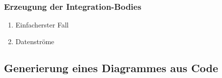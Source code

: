 \documentclass[11pt]{article}
\begin{document}
\subsubsection{Erzeugung der Integration-Bodies}
\label{sec:orgheadline45}
\begin{enumerate}
\item Einfacherster Fall
\label{sec:orgheadline43}
\item Datenströme
\label{sec:orgheadline44}
\end{enumerate}

\subsection{Generierung eines Diagrammes aus Code}
\label{sec:orgheadline47}
\end{document}
